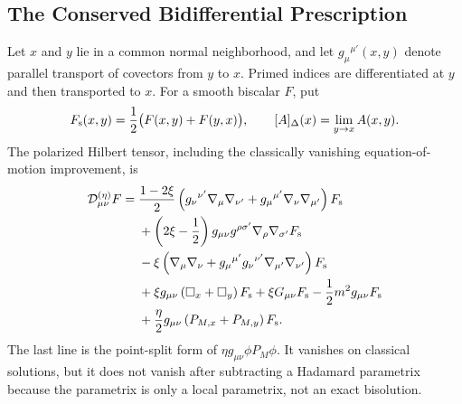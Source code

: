 \subsection{The Conserved Bidifferential Prescription}

Let \(x\) and \(y\) lie in a common normal neighborhood, and let
\(g_\mu{}^{\mu'}(x,y)\) denote parallel transport of covectors from \(y\) to
\(x\).  Primed indices are differentiated at \(y\) and then transported to
\(x\).  For a smooth biscalar \(F\), put
\[
  F_{\rm s}(x,y)=\frac12\bigl(F(x,y)+F(y,x)\bigr),
  \qquad
  [A]_\Delta(x)=\lim_{y\to x}A(x,y).
\]
The polarized Hilbert tensor, including the classically vanishing
equation-of-motion improvement, is
\begin{equation}
\begin{aligned}
  \mathcal D^{(\eta)}_{\mu\nu}F
  ={}&
  \frac{1-2\xi}{2}
  \left(
    g_\nu{}^{\nu'}\nabla_\mu\nabla_{\nu'}
    +g_\mu{}^{\mu'}\nabla_\nu\nabla_{\mu'}
  \right)F_{\rm s} \\
  &+
  \left(2\xi-\frac12\right)
  g_{\mu\nu}g^{\rho\sigma'}\nabla_\rho\nabla_{\sigma'}F_{\rm s} \\
  &-\xi
  \left(
    \nabla_\mu\nabla_\nu
    +g_\mu{}^{\mu'}g_\nu{}^{\nu'}\nabla_{\mu'}\nabla_{\nu'}
  \right)F_{\rm s} \\
  &+\xi g_{\mu\nu}
  \left(\Box_x+\Box_y\right)F_{\rm s}
  +\xi G_{\mu\nu}F_{\rm s}
  -\frac12m^2g_{\mu\nu}F_{\rm s} \\
  &+\frac{\eta}{2}g_{\mu\nu}
  \left(P_{M,x}+P_{M,y}\right)F_{\rm s}.
\end{aligned}
  \label{eq:point-split-stress-bidifferential-operator}
\end{equation}
The last line is the point-split form of
\(\eta g_{\mu\nu}\phi P_M\phi\).  It vanishes on classical solutions, but it
does not vanish after subtracting a Hadamard parametrix because the parametrix
is only a local parametrix, not an exact bisolution.

